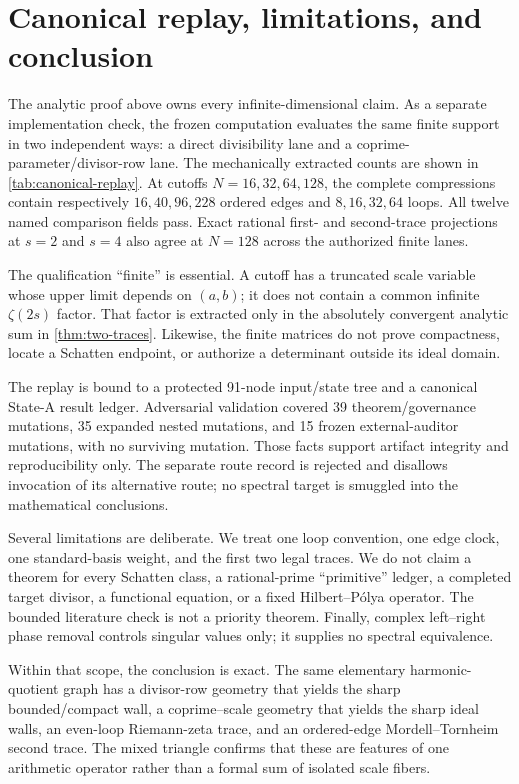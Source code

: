 \section{Canonical replay, limitations, and conclusion}
\label{sec:replay}

The analytic proof above owns every infinite-dimensional claim.  As a
separate implementation check, the frozen computation evaluates the same
finite support in two independent ways: a direct divisibility lane and a
coprime-parameter/divisor-row lane.  The mechanically extracted counts are
shown in \cref{tab:canonical-replay}.  At cutoffs
$N=16,32,64,128$, the complete compressions contain respectively
$16,40,96,228$ ordered edges and $8,16,32,64$ loops.  All twelve named
comparison fields pass.  Exact rational first- and second-trace projections
at $s=2$ and $s=4$ also agree at $N=128$ across the authorized finite
lanes.

\TableCanonicalReplay

The qualification ``finite'' is essential.  A cutoff has a truncated
scale variable whose upper limit depends on $(a,b)$; it does not contain a
common infinite $\zeta(2s)$ factor.  That factor is extracted only in the
absolutely convergent analytic sum in \cref{thm:two-traces}.  Likewise, the
finite matrices do not prove compactness, locate a Schatten endpoint, or
authorize a determinant outside its ideal domain.

The replay is bound to a protected 91-node input/state tree and a canonical
State-A result ledger.  Adversarial validation covered 39
theorem/governance mutations, 35 expanded nested mutations, and 15 frozen
external-auditor mutations, with no surviving mutation.  Those facts
support artifact integrity and reproducibility only.  The separate route
record is rejected and disallows invocation of its alternative route; no
spectral target is smuggled into the mathematical conclusions.

Several limitations are deliberate.  We treat one loop convention, one
edge clock, one standard-basis weight, and the first two legal traces.  We
do not claim a theorem for every Schatten class, a rational-prime
``primitive'' ledger, a completed target divisor, a functional equation, or
a fixed Hilbert--P\'olya operator.  The bounded literature check is not a
priority theorem.  Finally, complex left--right phase removal controls
singular values only; it supplies no spectral equivalence.

Within that scope, the conclusion is exact.  The same elementary
harmonic-quotient graph has a divisor-row geometry that yields the sharp
bounded/compact wall, a coprime--scale geometry that yields the sharp ideal
walls, an even-loop Riemann-zeta trace, and an ordered-edge
Mordell--Tornheim second trace.  The mixed triangle confirms that these are
features of one arithmetic operator rather than a formal sum of isolated
scale fibers.
